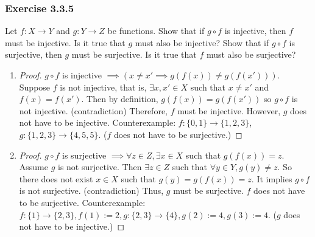 \documentclass[12pt, letter]{article}
\begin{document}
\subsubsection*{Exercise 3.3.5}
Let $f:X\to Y$ and $g:Y\to Z$ be functions. Show that if $g\circ f$ is injective, then $f$ must be injective. Is it true that $g$ must also be injective?
Show that if $g\circ f$ is surjective, then $g$ must be surjective. Is it true that $f$ must also be surjective?
\begin{enumerate}
    \item 
    \begin{proof}
    $g\circ f$ is injective $\implies (x\ne x'\implies g(f(x))\ne g(f(x')))$. Suppose $f$ is not injective, that is, $\exists x,x'\in X$ such that $x\ne x'$ and $f(x)=f(x')$. Then by definition, $g(f(x))=g(f(x'))$ so  
    $g\circ f$ is not injective. (contradiction) Therefore, $f$ must be injective.  However, $g$ does not have to be injective. Counterexample: $f:\{0,1\}\to\{1,2,3\}$, $g:\{1,2,3\}\to\{4,5,5\}$. ($f$ does not have to be surjective.)
    \end{proof}    
    \item
    \begin{proof}
        $g\circ f$ is surjective $\implies \forall z\in Z,\exists x\in X$ such that $g(f(x))=z$. 
        Assume $g$ is not surjective. Then $\exists z\in Z$ such that $\forall y\in Y, g(y)\ne z$. So there does not exist $x\in X$ such that $g(y)=g(f(x))=z$. It implies $g\circ f$ is not surjective. (contradiction) Thus, $g$ must be surjective.
        $f$ does not have to be surjective. Counterexample: $f:\{1\}\to\{2,3\},f(1):=2,g:\{2,3\}\to\{4\},g(2):=4,g(3):=4$. ($g$ does not have to be injective.)
    \end{proof}
\end{enumerate}
\end{document}
